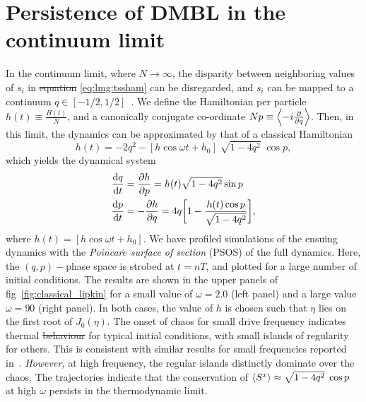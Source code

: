 \documentclass[%
reprint,
superscriptaddress,
amsmath,amssymb,
aps,
prb,
showkeys,
]{revtex4-2}
\providecommand{\DIFaddtex}[1]{{\protect\color{blue}\uwave{#1}}} %
\providecommand{\DIFdeltex}[1]{{\protect\color{red}\sout{#1}}}                      %
\providecommand{\DIFaddbegin}{} %
\providecommand{\DIFaddend}{} %
\providecommand{\DIFdelbegin}{} %
\providecommand{\DIFdelend}{} %
\providecommand{\DIFadd}[1]{\texorpdfstring{\DIFaddtex{#1}}{#1}} %
\providecommand{\DIFdel}[1]{\texorpdfstring{\DIFdeltex{#1}}{}} %
\newcommand{\DIFscaledelfig}{0.5}
\newlength{\DIFdelgraphicswidth} %
\newlength{\DIFdelgraphicsheight} %
\newcommand{\DIFaddincludegraphics}[2][]{{\color{blue}\fbox{\DIFOincludegraphics[#1]{#2}}}} %
\newcommand{\DIFdelincludegraphics}[2][]{%
\sbox{\DIFdelgraphicsbox}{\DIFOincludegraphics[#1]{#2}}%
\settoboxwidth{\DIFdelgraphicswidth}{\DIFdelgraphicsbox} %
\settoboxtotalheight{\DIFdelgraphicsheight}{\DIFdelgraphicsbox} %
\scalebox{\DIFscaledelfig}{%
\parbox[b]{\DIFdelgraphicswidth}{\usebox{\DIFdelgraphicsbox}\\[-\baselineskip] \rule{\DIFdelgraphicswidth}{0em}}\llap{\resizebox{\DIFdelgraphicswidth}{\DIFdelgraphicsheight}{%
\setlength{\unitlength}{\DIFdelgraphicswidth}%
\begin{picture}(1,1)%
\thicklines\linethickness{2pt} %
{\color[rgb]{1,0,0}\put(0,0){\framebox(1,1){}}}%
{\color[rgb]{1,0,0}\put(0,0){\line( 1,1){1}}}%
{\color[rgb]{1,0,0}\put(0,1){\line(1,-1){1}}}%
\end{picture}%
}\hspace*{3pt}}} %
} %
\DeclareRobustCommand{\DIFaddbegin}{\DIFOaddbegin \let\includegraphics\DIFaddincludegraphics} %
\DeclareRobustCommand{\DIFaddend}{\DIFOaddend \let\includegraphics\DIFOincludegraphics} %
\DeclareRobustCommand{\DIFdelbegin}{\DIFOdelbegin \let\includegraphics\DIFdelincludegraphics} %
\DeclareRobustCommand{\DIFdelend}{\DIFOaddend \let\includegraphics\DIFOincludegraphics} %
\begin{document}
\section{\label{sec:level4}Persistence of DMBL in the continuum limit}
In the continuum limit, where $N\rightarrow\infty$, the disparity between neighboring values of $s_i$ in \DIFdelbegin \DIFdel{equation }\DIFdelend \DIFaddbegin \DIFadd{eq.~}\DIFaddend \ref{eq:lmg:tssham} can be disregarded, and $s_i$ can be mapped to a continuum $q\in \left[-1/2, 1/2\right]$~\cite{mori_prethermalization_2019}. We define	the Hamiltonian per particle $h(t)\equiv \frac{H(t)}{N}$, and a canonically conjugate co-ordinate $Np\equiv \expval{-i\pdv{}{q}}$. Then, in this limit, the dynamics can be approximated by that of a classical Hamiltonian~\cite{sciolla_quantum_2010}
\begin{equation}
	h(t) = -2 q^2 - \left[h\cos{\omega t} + h_0\right]\;\sqrt{1-4q^2}\;\cos{p},
	\label{eq:class:ham}
\end{equation}
which yields the dynamical system 
\begin{align}
	\dv{q}{t} &= \pdv{h}{p} = h(t)\sqrt{1-4q^2}\sin{p}\nonumber \\
	\dv{p}{t} &= -\pdv{h}{q} = 4q\bigg[1-\frac{h(t)\cos{p}}{\sqrt{1-4q^2}}\bigg],
	\label{eq:class:poinc}
\end{align}
where $h(t) = \left[h\cos{\omega t} + h_0\right]$. We have profiled simulations of the ensuing dynamics with the \emph{Poincar$\acute{e}$ surface of section} (PSOS) of the full dynamics. Here, the $\left(q,p\right)-$phase space is strobed at $t=nT$, and plotted for a large number of initial conditions. The results are shown in the upper panels of fig\DIFaddbegin \DIFadd{.}\DIFaddend ~\ref{fig:classical_lipkin} for a small value of $\omega=2.0$ (left panel) and a large value $\omega=90$ (right panel). In both cases, the value of $h$ is chosen such that $\eta$ lies on the first root of $J_0(\eta)$. The onset of chaos for small drive frequency indicates thermal \DIFdelbegin \DIFdel{behaviour }\DIFdelend \DIFaddbegin \DIFadd{behavior }\DIFaddend for typical initial conditions, with small islands of regularity for others. This is consistent with similar results for small frequencies reported in~\cite{russomanno_thermalization_2015, Kidd2019}. \emph{However,} at high frequency, the regular islands distinctly dominate over the chaos. The trajectories indicate that the conservation of $\expval{S^x}\approx \sqrt{1-4q^2}\;\cos{p}$~\cite{mori_prethermalization_2019} at high $\omega$ persists in the thermodynamic limit.
\end{document}
